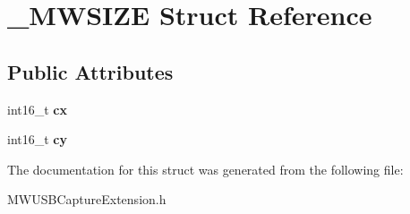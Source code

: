 \hypertarget{struct__MWSIZE}{\section{\-\_\-\-M\-W\-S\-I\-Z\-E Struct Reference}
\label{struct__MWSIZE}
}
\subsection*{Public Attributes}
\begin{DoxyCompactItemize}
\item 
\hypertarget{struct__MWSIZE_ace5909f9107ae007ff8f2e9004146644}{int16\-\_\-t {\bfseries cx}}\label{struct__MWSIZE_ace5909f9107ae007ff8f2e9004146644}

\item 
\hypertarget{struct__MWSIZE_a14fbf3fe143fc3d57f99d2516521756b}{int16\-\_\-t {\bfseries cy}}\label{struct__MWSIZE_a14fbf3fe143fc3d57f99d2516521756b}

\end{DoxyCompactItemize}


The documentation for this struct was generated from the following file\-:\begin{DoxyCompactItemize}
\item 
M\-W\-U\-S\-B\-Capture\-Extension.\-h\end{DoxyCompactItemize}

